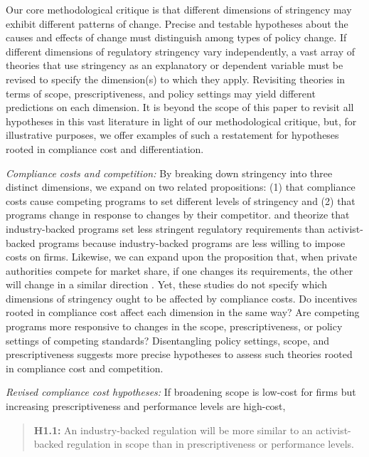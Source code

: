 \documentclass[
      12pt,
            Review ]{article}
\begin{document}
Our core methodological critique is that different dimensions of
stringency may exhibit different patterns of change. Precise and
testable hypotheses about the causes and effects of change must
distinguish among types of policy change. If different dimensions of
regulatory stringency vary independently, a vast array of theories that
use stringency as an explanatory or dependent variable must be revised
to specify the dimension(s) to which they apply. Revisiting theories in
terms of scope, prescriptiveness, and policy settings may yield
different predictions on each dimension. It is beyond the scope of this
paper to revisit all hypotheses in this vast literature in light of our
methodological critique, but, for illustrative purposes, we offer
examples of such a restatement for hypotheses rooted in compliance cost
and differentiation.

\emph{Compliance costs and competition:} By breaking down stringency
into three distinct dimensions, we expand on two related propositions:
(1) that compliance costs cause competing programs to set different
levels of stringency and (2) that programs change in response to changes
by their competitor. \citet{Cashore2004} and \citet{Fischer2014}
theorize that industry-backed programs set less stringent regulatory
requirements than activist-backed programs because industry-backed
programs are less willing to impose costs on firms. Likewise, we can
expand upon the proposition that, when private authorities compete for
market share, if one changes its requirements, the other will change in
a similar direction \citep{Fischer2014, Smith2010}. Yet, these studies
do not specify which dimensions of stringency ought to be affected by
compliance costs. Do incentives rooted in compliance cost affect each
dimension in the same way? Are competing programs more responsive to
changes in the scope, prescriptiveness, or policy settings of competing
standards? Disentangling policy settings, scope, and prescriptiveness
suggests more precise hypotheses to assess such theories rooted in
compliance cost and competition.

\emph{Revised compliance cost hypotheses:} If broadening scope is
low-cost for firms but increasing prescriptiveness and performance
levels are high-cost,

\begin{quote}
\textbf{H1.1:} An industry-backed regulation will be more similar to an
activist-backed regulation in scope than in prescriptiveness or
performance levels.
\end{quote}
\end{document}
